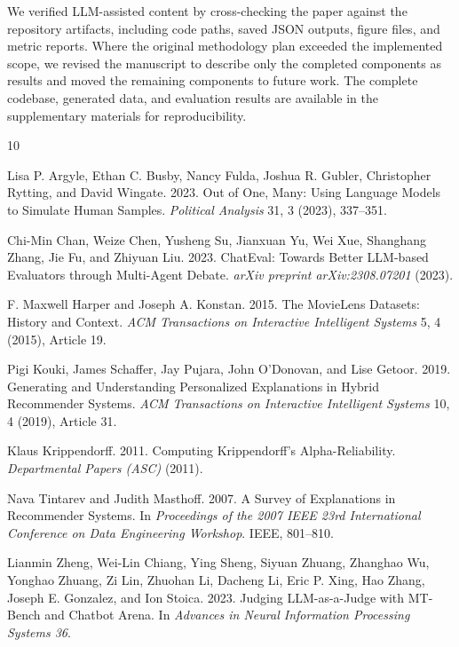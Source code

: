 \documentclass[sigconf,nonacm]{acmart}
\begin{document}
We verified LLM-assisted content by cross-checking the paper against the repository artifacts, including code paths, saved JSON outputs, figure files, and metric reports. Where the original methodology plan exceeded the implemented scope, we revised the manuscript to describe only the completed components as results and moved the remaining components to future work. The complete codebase, generated data, and evaluation results are available in the supplementary materials for reproducibility.


\begin{thebibliography}{10}

Lisa P. Argyle, Ethan C. Busby, Nancy Fulda, Joshua R. Gubler, Christopher Rytting, and David Wingate. 2023.
Out of One, Many: Using Language Models to Simulate Human Samples.
\textit{Political Analysis} 31, 3 (2023), 337--351.

Chi-Min Chan, Weize Chen, Yusheng Su, Jianxuan Yu, Wei Xue, Shanghang Zhang, Jie Fu, and Zhiyuan Liu. 2023.
ChatEval: Towards Better LLM-based Evaluators through Multi-Agent Debate.
\textit{arXiv preprint arXiv:2308.07201} (2023).

F. Maxwell Harper and Joseph A. Konstan. 2015.
The MovieLens Datasets: History and Context.
\textit{ACM Transactions on Interactive Intelligent Systems} 5, 4 (2015), Article 19.

Pigi Kouki, James Schaffer, Jay Pujara, John O'Donovan, and Lise Getoor. 2019.
Generating and Understanding Personalized Explanations in Hybrid Recommender Systems.
\textit{ACM Transactions on Interactive Intelligent Systems} 10, 4 (2019), Article 31.

Klaus Krippendorff. 2011.
Computing Krippendorff's Alpha-Reliability.
\textit{Departmental Papers (ASC)} (2011).

Nava Tintarev and Judith Masthoff. 2007.
A Survey of Explanations in Recommender Systems.
In \textit{Proceedings of the 2007 IEEE 23rd International Conference on Data Engineering Workshop}. IEEE, 801--810.

Lianmin Zheng, Wei-Lin Chiang, Ying Sheng, Siyuan Zhuang, Zhanghao Wu, Yonghao Zhuang, Zi Lin, Zhuohan Li, Dacheng Li, Eric P. Xing, Hao Zhang, Joseph E. Gonzalez, and Ion Stoica. 2023.
Judging LLM-as-a-Judge with MT-Bench and Chatbot Arena.
In \textit{Advances in Neural Information Processing Systems 36}.

\end{thebibliography}
\end{document}
